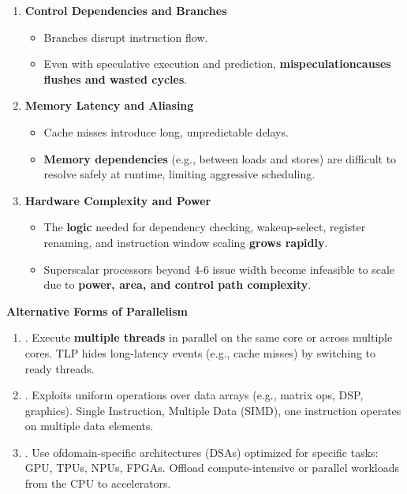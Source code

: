 \begin{enumerate}
    \item \textcolor{Red2}{\textbf{Control Dependencies and Branches}}
    \begin{itemize}
        \item Branches disrupt instruction flow.
        \item Even with speculative execution and prediction, \textbf{mispeculation\break causes flushes and wasted cycles}.
    \end{itemize}

    \item \textcolor{Red2}{\textbf{Memory Latency and Aliasing}}
    \begin{itemize}
        \item Cache misses introduce long, unpredictable delays.
        \item \textbf{Memory dependencies} (e.g., between loads and stores) are difficult to resolve safely at runtime, limiting aggressive scheduling.
    \end{itemize}

    \item \textcolor{Red2}{\textbf{Hardware Complexity and Power}}
    \begin{itemize}
        \item The \textbf{logic} needed for dependency checking, wakeup-select, register renaming, and instruction window scaling \textbf{grows rapidly}.
        \item Superscalar processors beyond 4-6 issue width become infeasible to scale due to \textbf{power, area, and control path complexity}.
    \end{itemize}
\end{enumerate}

\highspace
\begin{flushleft}
    \textcolor{Green3}{ \textbf{Alternative Forms of Parallelism}}
\end{flushleft}
\begin{enumerate}
    \item {}. Execute \textbf{multiple threads} in parallel on the same core or across multiple cores. TLP hides long-latency events (e.g., cache misses) by switching to ready threads.
    \item {}. Exploits uniform operations over data arrays (e.g., matrix ops, DSP, graphics). Single Instruction, Multiple Data (SIMD), one instruction operates on multiple data elements.
    \item {}. Use of\break domain-specific architectures (DSAs) optimized for specific tasks: GPU, TPUs, NPUs, FPGAs. Offload compute-intensive or parallel workloads from the CPU to accelerators.
\end{enumerate}